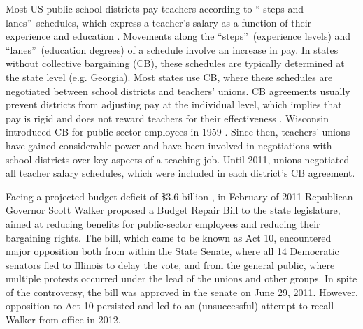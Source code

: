 \documentclass[notitlepage,12pt]{article}%
\begin{document}
Most US public school districts pay teachers according to \textquotedblleft
steps-and-lanes\textquotedblright\ schedules, which express a teacher's salary
as a function of their experience and education \citep{podgursky2006teams}.
Movements along the \textquotedblleft steps\textquotedblright\ (experience
levels) and \textquotedblleft lanes\textquotedblright\ (education degrees) of
a schedule involve an increase in pay. In states without collective bargaining
(CB), these schedules are typically determined at the state level (e.g.
Georgia). Most states use CB, where these schedules are negotiated between
school districts and teachers' unions. CB agreements usually prevent districts
from adjusting pay at the individual level, which implies that pay is rigid
and does not reward teachers for their effectiveness
\citep{podgursky2006teams}. Wisconsin introduced CB for public-sector
employees in 1959 \citep{moe2013primer}. Since then, teachers' unions have
gained considerable power and have been involved in negotiations with school
districts over key aspects of a teaching job. Until 2011, unions negotiated
all teacher salary schedules, which were included in each district's CB agreement.

Facing a projected budget deficit of \$3.6 billion  \citep{wisconsin_taxpayers_alliance_2011}, in February of 2011
Republican Governor Scott Walker proposed a Budget Repair Bill to the state
legislature, aimed at reducing benefits for public-sector employees and
reducing their bargaining rights. The bill, which came to be known as Act 10,
encountered major opposition both from within the State Senate, where all 14
Democratic senators fled to Illinois to delay the vote, and from the general
public, where multiple protests occurred under the lead of the unions and
other groups. In spite of the controversy, the bill was approved in the senate
on June 29, 2011. However, opposition to Act 10 persisted and led to an
(unsuccessful) attempt to recall Walker from office in 2012.
\end{document}
